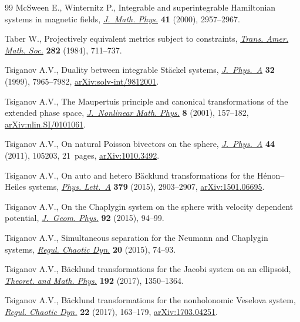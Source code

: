 \documentclass[10pt,a4paper]{amsart}
\numberwithin{equation}{section}
\begin{document}
\begin{thebibliography}{99}
McSween E., Winternitz P., Integrable and superintegrable {H}amiltonian systems
  in magnetic fields, \href{https://doi.org/10.1063/1.533283}{\textit{J.~Math. Phys.}} \textbf{41} (2000), 2957--2967.

Taber W., Projectively equivalent metrics subject to constraints,
  \href{https://doi.org/10.2307/1999261}{\textit{Trans. Amer. Math. Soc.}} \textbf{282} (1984), 711--737.

Tsiganov A.V., Duality between integrable {S}t\"ackel systems,
  \href{https://doi.org/10.1088/0305-4470/32/45/311}{\textit{J.~Phys.~A}} \textbf{32} (1999), 7965--7982,
  \href{https://arxiv.org/abs/solv-int/9812001}{arXiv:solv-int/9812001}.

Tsiganov A.V., The {M}aupertuis principle and canonical transformations of the
  extended phase space, \href{https://doi.org/10.2991/jnmp.2001.8.1.12}{\textit{J.~Nonlinear Math. Phys.}} \textbf{8} (2001),
  157--182, \href{https://arxiv.org/abs/nlin.SI/0101061}{arXiv:nlin.SI/0101061}.

Tsiganov A.V., On natural {P}oisson bivectors on the sphere,
  \href{https://doi.org/10.1088/1751-8113/44/10/105203}{\textit{J.~Phys.~A}} \textbf{44} (2011), 105203, 21~pages, \href{https://arxiv.org/abs/1010.3492}{arXiv:1010.3492}.

Tsiganov A.V., On auto and hetero {B}\"acklund transformations for the
  {H}\'{e}non--{H}eiles systems, \href{https://doi.org/10.1016/j.physleta.2015.08.023}{\textit{Phys. Lett.~A}} \textbf{379} (2015),
  2903--2907, \href{https://arxiv.org/abs/1501.06695}{arXiv:1501.06695}.

Tsiganov A.V., On the {C}haplygin system on the sphere with velocity dependent
  potential, \href{https://doi.org/10.1016/j.geomphys.2015.02.006}{\textit{J.~Geom. Phys.}} \textbf{92} (2015), 94--99.

Tsiganov A.V., Simultaneous separation for the {N}eumann and {C}haplygin
  systems, \href{https://doi.org/10.1134/S1560354715010062}{\textit{Regul. Chaotic Dyn.}} \textbf{20} (2015), 74--93.

Tsiganov A.V., B\"acklund transformations for the {J}acobi system on an
  ellipsoid, \href{https://doi.org/10.1134/S0040577917090069}{\textit{Theoret. and Math. Phys.}} \textbf{192} (2017), 1350--1364.

Tsiganov A.V., B\"acklund transformations for the nonholonomic {V}eselova
  system, \href{https://doi.org/10.1134/S1560354717020058}{\textit{Regul. Chaotic Dyn.}} \textbf{22} (2017), 163--179,
  \href{https://arxiv.org/abs/1703.04251}{arXiv:1703.04251}.


\end{thebibliography}
\end{document}
